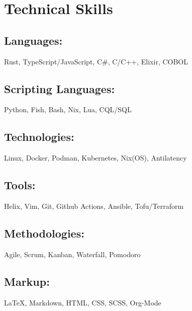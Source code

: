 \section{Technical Skills}

\subsection{Languages:} Rust, TypeScript/JavaScript, C\#, C/C++, Elixir, COBOL
\subsection{Scripting Languages:} Python, Fish, Bash, Nix, Lua, CQL/SQL 
\subsection{Technologies:} Linux, Docker, Podman, Kubernetes, Nix(OS), Antilatency 
\subsection{Tools:} Helix, Vim, Git, Github Actions, Ansible, Tofu/Terraform
\subsection{Methodologies:} Agile, Scrum, Kanban, Waterfall, Pomodoro
\subsection{Markup:} {\LaTeX}, Markdown, HTML, CSS, SCSS, Org-Mode
  